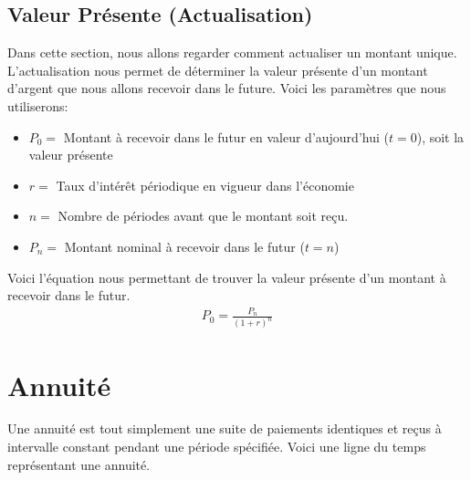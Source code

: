 \documentclass[12pt]{article}
\begin{document}
\subsection{Valeur Présente (Actualisation)}
Dans cette section, nous allons regarder comment actualiser un montant unique. L'actualisation nous permet de déterminer la valeur présente d'un montant d'argent que nous allons recevoir dans le future. Voici les paramètres que nous utiliserons:
\begin{itemize}
\item $P_0=$ Montant à recevoir dans le futur en valeur d'aujourd'hui ($t=0$), soit la valeur présente  
\item $r=$ Taux d'intérêt périodique en vigueur dans l'économie
\item $n=$ Nombre de périodes avant que le montant soit reçu.
\item $P_n=$ Montant nominal à recevoir dans le futur ($t=n$)
\end{itemize}

Voici l'équation nous permettant de trouver la valeur présente d'un montant à recevoir dans le futur.
\begin{align*}
P_0=\frac{P_n}{(1+r)^n}
\end{align*}

\pagebreak \newpage

\section{Annuité}

Une annuité est tout simplement une suite de paiements identiques et reçus à intervalle constant pendant une période spécifiée. Voici une ligne du temps représentant une annuité.

\end{document}

